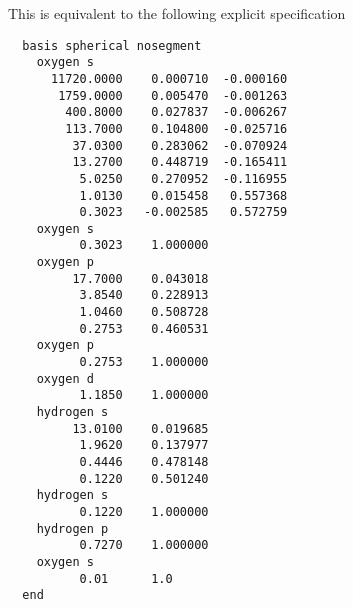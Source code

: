 This is equivalent to the following explicit specification
\begin{verbatim}
  basis spherical nosegment
    oxygen s
      11720.0000    0.000710  -0.000160
       1759.0000    0.005470  -0.001263
        400.8000    0.027837  -0.006267
        113.7000    0.104800  -0.025716
         37.0300    0.283062  -0.070924
         13.2700    0.448719  -0.165411
          5.0250    0.270952  -0.116955
          1.0130    0.015458   0.557368
          0.3023   -0.002585   0.572759
    oxygen s                
          0.3023    1.000000
    oxygen p                
         17.7000    0.043018
          3.8540    0.228913
          1.0460    0.508728
          0.2753    0.460531
    oxygen p                
          0.2753    1.000000
    oxygen d
          1.1850    1.000000
    hydrogen s
         13.0100    0.019685
          1.9620    0.137977
          0.4446    0.478148
          0.1220    0.501240
    hydrogen s  
          0.1220    1.000000
    hydrogen p  
          0.7270    1.000000
    oxygen s
          0.01      1.0
  end
\end{verbatim}




